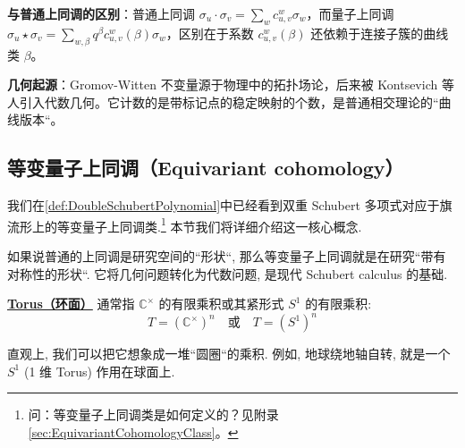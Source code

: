 \textbf{与普通上同调的区别}：普通上同调 $\sigma_u \cdot \sigma_v = \sum_w c^w_{u,v} \sigma_w$，而量子上同调 $\sigma_u \star \sigma_v = \sum_{w,\beta} q^{\beta} c^w_{u,v}(\beta) \sigma_w$，区别在于系数 $c^w_{u,v}(\beta)$ 还依赖于连接子簇的曲线类 $\beta$。

\textbf{几何起源}：Gromov-Witten 不变量源于物理中的拓扑场论，后来被 Kontsevich 等人引入代数几何。它计数的是带标记点的稳定映射的个数，是普通相交理论的``曲线版本``。

\subsection{等变量子上同调（Equivariant cohomology）}

我们在\cref{def:DoubleSchubertPolynomial}中已经看到双重 Schubert 多项式对应于旗流形上的等变量子上同调类.\footnote{问：等变量子上同调类是如何定义的？见附录 \cref{sec:EquivariantCohomologyClass}。} 本节我们将详细介绍这一核心概念.

如果说普通的上同调是研究空间的``形状``, 那么等变量子上同调就是在研究``带有对称性的形状``. 它将几何问题转化为代数问题, 是现代 Schubert calculus 的基础.

\begin{Definition}[Torus（环面）]
\label{def:Torus}
\textbf{\underline{Torus（环面）}} 通常指 $\mathbb{C}^\times$ 的有限乘积或其紧形式 $S^1$ 的有限乘积:
$$T = (\mathbb{C}^\times)^n \quad \text{或} \quad T = (S^1)^n$$

直观上, 我们可以把它想象成一堆``圆圈``的乘积. 例如, 地球绕地轴自转, 就是一个 $S^1$ (1 维 Torus) 作用在球面上.
\end{Definition}

